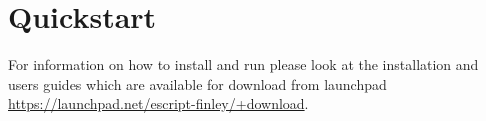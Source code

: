 
%
%
%

\section{Quickstart}
For information on how to install and run \esc please look at the installation and users guides which are available for download from launchpad \url{https://launchpad.net/escript-finley/+download}.